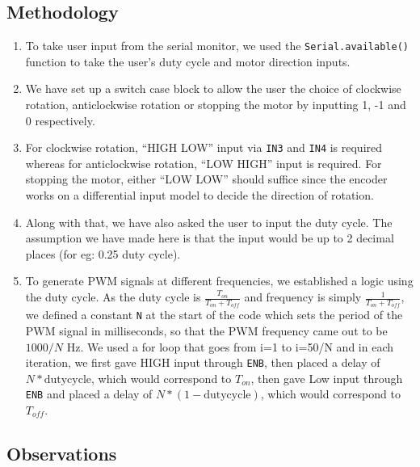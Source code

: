 \documentclass[12pt]{article}
\begin{document}
\subsection{Methodology}
\begin{enumerate}
    \item To take user input from the serial monitor, we used the \texttt{Serial.available()} function to take the user's duty cycle and motor direction inputs.
    \item We have set up a switch case block to allow the user the choice of clockwise rotation, anticlockwise rotation or stopping the motor by inputting 1, -1 and 0 respectively.
    \item For clockwise rotation, “HIGH LOW” input via \texttt{IN3} and \texttt{IN4} is required whereas for anticlockwise rotation, “LOW HIGH” input is required. For stopping the motor, either “LOW LOW” should suffice since the encoder works on a differential input model to decide the direction of rotation.
    \item Along with that, we have also asked the user to input the duty cycle. The assumption we have made here is that the input would be up to 2 decimal places (for eg: 0.25 duty cycle).
    \item To generate PWM signals at different frequencies, we established a logic using the duty cycle. As the duty cycle is \(\frac{T_{on}}{T_{on}+T_{off}}\) and frequency is simply \(\frac{1}{T_{on}+T_{off}}\), we defined a constant \texttt{N} at the start of the code which sets the period of the PWM signal in milliseconds, so that the PWM frequency came out to be \(1000/N\) Hz. We used a for loop that goes from i=1 to i=50/N and in each iteration, we first gave HIGH input through \texttt{\texttt{ENB}}, then placed a delay of \(N*\text{dutycycle}\), which would correspond to \(T_{on}\), then gave Low input through \texttt{\texttt{ENB}} and placed a delay of \(N*(1-\text{dutycycle})\), which would correspond to \(T_{off}\).
\end{enumerate}

\pagebreak
\subsection{Observations}
\end{document}
